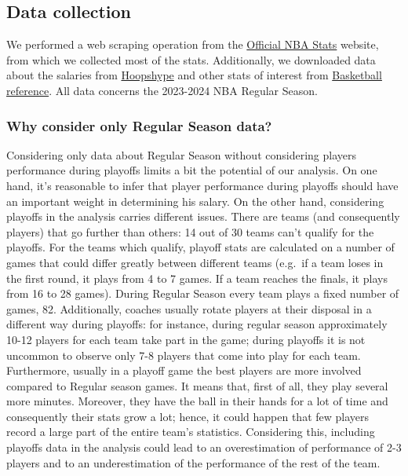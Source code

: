 \documentclass[
]{article}
\begin{document}
\hypertarget{data-collection}{%
\subsection{Data collection}\label{data-collection}}

We performed a web scraping operation from the
\href{https://www.nba.com/stats}{Official NBA Stats} website, from which
we collected most of the stats. Additionally, we downloaded data about
the salaries from \href{https://hoopshype.com/}{Hoopshype} and other
stats of interest from
\href{https://www.basketball-reference.com}{Basketball reference}. All
data concerns the 2023-2024 NBA Regular Season.

\hypertarget{why-consider-only-regular-season-data}{%
\subsubsection{Why consider only Regular Season
data?}\label{why-consider-only-regular-season-data}}

Considering only data about Regular Season without considering players
performance during playoffs limits a bit the potential of our analysis.
On one hand, it's reasonable to infer that player performance during
playoffs should have an important weight in determining his salary. On
the other hand, considering playoffs in the analysis carries different
issues. There are teams (and consequently players) that go further than
others: 14 out of 30 teams can't qualify for the playoffs. For the teams
which qualify, playoff stats are calculated on a number of games that
could differ greatly between different teams (e.g.~if a team loses in
the first round, it plays from 4 to 7 games. If a team reaches the
finals, it plays from 16 to 28 games). During Regular Season every team
plays a fixed number of games, 82. Additionally, coaches usually rotate
players at their disposal in a different way during playoffs: for
instance, during regular season approximately 10-12 players for each
team take part in the game; during playoffs it is not uncommon to
observe only 7-8 players that come into play for each team. Furthermore,
usually in a playoff game the best players are more involved compared to
Regular season games. It means that, first of all, they play several
more minutes. Moreover, they have the ball in their hands for a lot of
time and consequently their stats grow a lot; hence, it could happen
that few players record a large part of the entire team's statistics.
Considering this, including playoffs data in the analysis could lead to
an overestimation of performance of 2-3 players and to an
underestimation of the performance of the rest of the team.
\end{document}
